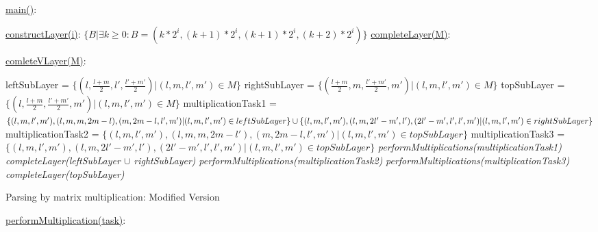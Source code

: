 \documentclass{article}
\begin{document}
\begin{algorithm}
\SetAlgoNoLine
{}
\underline{main()}{:}{
 
 \BlankLine
 }
 
\underline{constructLayer(i)}{:}{
 \BlankLine
 $\{B | \exists k \geq 0 : B = (k*2^i, (k+1)*2^i, (k + 1)*2^i, (k+2)*2^i) \}$
 \BlankLine
    }
\underline{completeLayer(M)}{:}{
\BlankLine
{}
\BlankLine
}
 
\underline{comleteVLayer(M)}{:}{
 \BlankLine
 leftSubLayer = $\{ (l, \frac{l+m}{2}, l', \frac{l'+m'}{2}) | (l, m, l', m') \in M\}$\;
 rightSubLayer = $\{ (\frac{l+m}{2}, m, \frac{l'+m'}{2}, m') | (l, m, l', m') \in M\}$\;
 topSubLayer = $\{ (l, \frac{l+m}{2}, \frac{l'+m'}{2}, m') | (l, m, l', m') \in M\}$\;
 multiplicationTask1 = $\{(l, m, l', m'), (l, m, m, 2m - l), (m, 2m - l, l', m') | (l, m, l', m') \in leftSubLayer\} \cup \linebreak  \{(l, m, l', m'), (l, m, 2l' - m', l'), (2l' - m', l', l', m') | (l, m, l', m') \in rightSubLayer\}$\;
 \BlankLine
 multiplicationTask2 = $\{(l, m, l', m'), (l, m, m, 2m - l'), (m, 2m - l, l', m') | (l, m, l', m') \in topSubLayer\}$\;
 \BlankLine 
 multiplicationTask3 = $\{(l, m, l', m'), (l, m, 2l' - m', l'), (2l' - m', l', l', m') | (l, m, l', m') \in topSubLayer\}$\;
 \BlankLine
 \textit{performMultiplications(multiplicationTask1)}\;
 \textit{completeLayer(leftSubLayer $\cup$ rightSubLayer)}\;
 \textit{performMultiplications(multiplicationTask2)}\;
 \textit{performMultiplications(multiplicationTask3)}\;
 \textit{completeLayer(topSubLayer)}
 
 }

\caption{Parsing by matrix multiplication:  Modified Version}
\end{algorithm}

\begin{algorithm}[h!]
\SetAlgoNoLine
\underline{performMultiplication(task)}{:}{\\
}
\caption{}
\end{algorithm}
\end{document}
